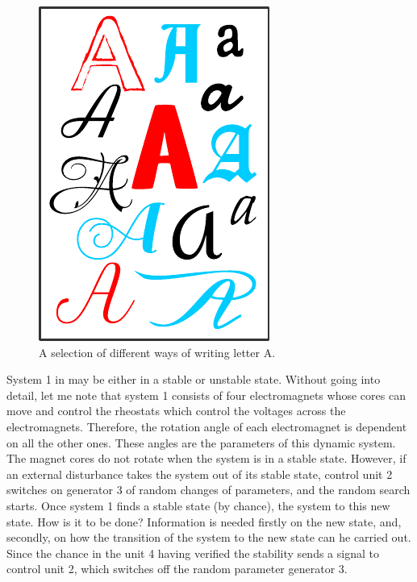 \begin{figure}
 \centering
 \includegraphics[width=0.9\linewidth]{figures/fonts.pdf}
\caption{A selection of different ways of writing letter A.}
\label{fonts}
 \end{figure}

System 1 in  may be either in a stable or unstable state.
Without going into detail, let me note that system 1 consists of four
electromagnets whose cores can move and control the rheostats which
control the voltages across the electromagnets. Therefore, the rotation
angle of each electromagnet is dependent on all the other ones. These
angles are the parameters of this dynamic system. The magnet cores do
not rotate when the system is in a stable state. However, if an external
disturbance takes the system out of its stable state, control unit
2 switches on generator 3 of random changes of parameters, and the
random search starts. Once system 1 finds a stable state (by chance),
the system to this new state. How is it to be done? Information is
needed firstly on the new state, and, secondly, on how the transition of
the system to the new state can he carried out. Since the chance in the
unit 4 having verified the stability sends a signal to control unit 2, which
switches off the random parameter generator 3.

